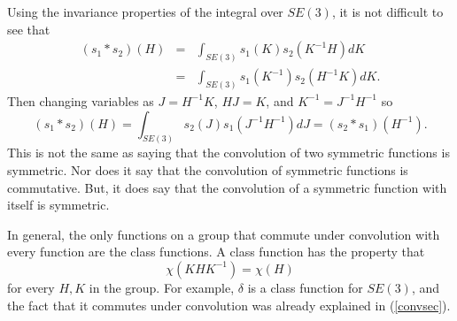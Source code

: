\documentclass[twocolumn,10pt]{asme2ej}
\begin{document}
Using the invariance properties of the integral over $SE(3)$, it is not difficult to see that 
\begin{eqnarray*}
(s_1 * s_2)(H) &=& \int_{SE(3)} s_1(K) s_2(K^{-1} H) dK \\
&=& \int_{SE(3)} s_1(K^{-1}) s_2(H^{-1} K) dK. \end{eqnarray*}
Then changing variables as $J = H^{-1} K$, $HJ =K$, and $K^{-1} = J^{-1} H^{-1}$ so
$$ (s_1 * s_2)(H) = \int_{SE(3)} s_2(J) s_1(J^{-1} H^{-1}) dJ = (s_2 * s_1)(H^{-1}). $$
This is not the same as saying that the convolution of two symmetric functions is symmetric. Nor does it say that
the convolution of symmetric functions is commutative. But, it does say that
the convolution of a symmetric function with itself is symmetric. 

In general, the only functions on a group that commute under convolution with every function are the class functions.
A class function has the property that
$$ \chi(K H K^{-1}) = \chi(H) $$
for every $H,K$ in the group. For example, $\delta$ is a class function for $SE(3)$, and the fact that it commutes under
convolution was already explained in (\ref{convsec}).





%




\end{document}
